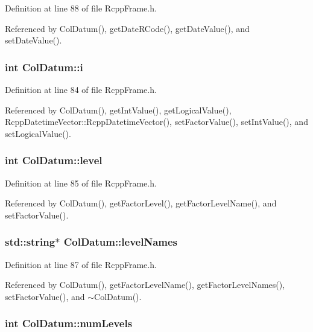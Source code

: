 Definition at line 88 of file RcppFrame.h.

Referenced by ColDatum(), getDateRCode(), getDateValue(), and setDateValue().\hypertarget{classColDatum_a4ceff4204e29f345957cb5544f40104f}{
\subsubsection[{i}]{\setlength{\rightskip}{0pt plus 5cm}int {\bf ColDatum::i}}}
\label{classColDatum_a4ceff4204e29f345957cb5544f40104f}


Definition at line 84 of file RcppFrame.h.

Referenced by ColDatum(), getIntValue(), getLogicalValue(), RcppDatetimeVector::RcppDatetimeVector(), setFactorValue(), setIntValue(), and setLogicalValue().\hypertarget{classColDatum_a7b0fc92a094e9d1a865fd84c939170d0}{
\subsubsection[{level}]{\setlength{\rightskip}{0pt plus 5cm}int {\bf ColDatum::level}}}
\label{classColDatum_a7b0fc92a094e9d1a865fd84c939170d0}


Definition at line 85 of file RcppFrame.h.

Referenced by ColDatum(), getFactorLevel(), getFactorLevelName(), and setFactorValue().\hypertarget{classColDatum_a2abac3c574e1ab36531b03849197f779}{
\subsubsection[{levelNames}]{\setlength{\rightskip}{0pt plus 5cm}std::string$\ast$ {\bf ColDatum::levelNames}}}
\label{classColDatum_a2abac3c574e1ab36531b03849197f779}


Definition at line 87 of file RcppFrame.h.

Referenced by ColDatum(), getFactorLevelName(), getFactorLevelNames(), setFactorValue(), and $\sim$ColDatum().\hypertarget{classColDatum_a42954a262993eee014db2d1fd7a7c34f}{
\subsubsection[{numLevels}]{\setlength{\rightskip}{0pt plus 5cm}int {\bf ColDatum::numLevels}}}
\label{classColDatum_a42954a262993eee014db2d1fd7a7c34f}


